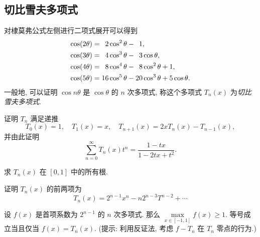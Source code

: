 \subsection{切比雪夫多项式}
对棣莫弗公式左侧进行二项式展开可以得到
\begin{align*}
  \cos(2\theta)&=\hphantom{1}2\cos^2\theta-\hphantom{1}1,\\
  \cos(3\theta)&=\hphantom{1}4\cos^3\theta-\hphantom{1}3\cos\theta,\\
  \cos(4\theta)&=\hphantom{1}8\cos^4\theta-\hphantom{1}8\cos^2\theta+1,\\
  \cos(5\theta)&=16\cos^5\theta-20\cos^3\theta+5\cos\theta.
\end{align*}
一般地, 可以证明 $\cos{n\theta}$ 是 $\cos\theta$ 的 $n$ 次多项式, 称这个多项式 $T_n(x)$ 为\emph{切比雪夫多项式}.
\begin{exlist}
  \item 证明 $T_n$ 满足递推
  \[T_0(x)=1,\quad T_1(x)=x,\quad
  T_{n+1}(x)=2xT_n(x)-T_{n-1}(x),\]
  并由此证明
  \[\sum_{n=0}^\infty T_n(x)t^n=\frac{1-tx}{1-2tx+t^2}.\]
  \item 求 $T_n(x)$ 在 $[0,1]$ 中的所有根.
  \item 证明 $T_n(x)$ 的前两项为
  \[T_n(x)=2^{n-1}x^n-n2^{n-3}T^{n-2}+\cdots\]
  \item 设 $f(x)$ 是首项系数为 $2^{n-1}$ 的 $n$ 次多项式. 那么 $\max\limits_{x\in[-1,1]}f(x)\ge 1$.
  等号成立当且仅当 $f(x)=T_n(x)$. (提示: 利用反证法, 考虑 $f-T_n$ 在 $T_n$ 零点的行为.)
\end{exlist}

